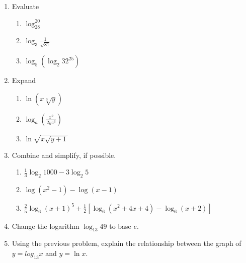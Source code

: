 \documentclass[11pt]{article}
\begin{document}
\begin{enumerate}
\item Evaluate
\begin{enumerate}
\item $\log_28^{20} $
\vfill
\item $\log_3 \frac{1}{\sqrt{81}}$
\vfill 
\item $ \log_5(\log_2 32^{25})$
\vfill
\end{enumerate}
\item Expand
\begin{enumerate}
\item $ \ln (x\sqrt[3]{y})$
\vfill
\item $\log_a\left(\frac{x^2}{2yz^3} \right)$
\vfill
\item $\ln\sqrt{x\sqrt{y+1}}$
\vfill
\end{enumerate}
\newpage
\item Combine and simplify, if possible.
\begin{enumerate}
\item $\frac{1}{3}\log_2 1000 - 3 \log_2 5 $
\vfill
\item $\log (x^2-1) - \log (x-1) $
\vfill
\item $\frac{2}{5} \log_6 (x+1)^5 + \frac{1}{2} \left[ \log_6 (x^2+4x+4) - \log_6(x+2)\right]$
\vfill
\end{enumerate}
\item Change the logarithm $\log_{13} 49 $ to base $e.$
\vfill
\item Using the previous problem, explain the relationship between the graph of $y=log_{13} x$ and $y=\ln x.$
\vfill




\end{enumerate}
\end{document}
